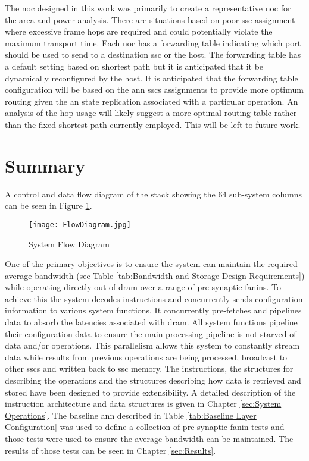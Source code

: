 The \ac{noc} designed in this work was primarily to create a representative \ac{noc} for the area and power analysis.
There are situations based on poor \ac{ssc} assignment where excessive frame hops are required and could potentially violate the maximum transport time.
Each \ac{noc} has a forwarding table indicating which port should be used to send to a destination \ac{ssc} or the host.
The forwarding table has a default setting based on shortest path but it is anticipated that it be dynamically reconfigured by the host.
It is anticipated that the forwarding table configuration will be based on the \ac{ann} \acp{ssc} assignments to provide more optimum routing given the \ac{an} state replication associated with a particular operation.
An analysis of the hop usage will likely suggest a more optimal routing table rather than the fixed shortest path currently employed. This will be left to future work.


\section{Summary}
\label{sec:Overview Summary}

A control and data flow diagram of the stack showing the 64 sub-system columns can be seen in Figure \ref{fig:FlowDiagram}.
\begin{figure}[!t]
\centering
\captionsetup{justification=centering}
\centerline{
\mbox{\texttt{[image: FlowDiagram.jpg]}}
}
\caption{System Flow Diagram}
\label{fig:FlowDiagram}
\end{figure}


One of the primary objectives is to ensure the system can maintain the required average bandwidth (see Table \ref{tab:Bandwidth and Storage Design Requirements}) while operating directly out of \ac{dram} over a range of pre-synaptic fanins.
To achieve this the system decodes instructions and concurrently sends configuration information to various system functions.
It concurrently pre-fetches and pipelines data to absorb the latencies associated with \ac{dram}.
All system functions pipeline their configuration data to ensure the main processing pipeline is not starved of data and/or operations.
This parallelism allows this system to constantly stream data while results from previous operations are being processed, broadcast to other \acp{ssc} and written back to \ac{ssc} memory.
The instructions, the structures for describing the operations and the structures describing how data is retrieved and stored have been designed to provide extensibility.
A detailed description of the instruction architecture and data structures is given in Chapter \ref{sec:System Operations}.
The baseline \ac{ann} described in Table \ref{tab:Baseline Layer Configuration} was used to define a collection of pre-synaptic fanin tests and those tests were used to ensure the average bandwidth can be maintained.
The results of those tests can be seen in Chapter \ref{sec:Results}.


